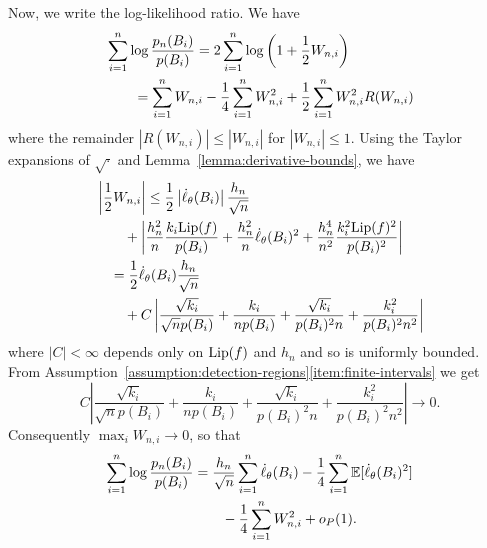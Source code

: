 Now, we write the log-likelihood ratio. We have
\begin{align*}
  & \sum_{i = 1}^n \log \frac{p_n(B_i)}{p(B_i)}
  = 2 \sum_{i = 1}^n \log\left(1 + \frac{1}{2} W_{n,i}\right) \\
  & \qquad  = \sum_{i = 1}^n W_{n,i}
  - \frac{1}{4} \sum_{i = 1}^n W_{n,i}^2
  + \frac{1}{2} \sum_{i = 1}^n W_{n,i}^2 R(W_{n,i})
\end{align*}
where the remainder $|R(W_{n,i})| \le |W_{n,i}|$ for $|W_{n,i}| \le 1$.
Using the Taylor expansions of $\sqrt{\cdot}$ and
Lemma~\ref{lemma:derivative-bounds}, we have
\begin{align}
  &\left| \frac{1}{2} W_{n,i} \right|
   \leq \frac{1}{2} \left| \dot{\ell}_\theta(B_i) \right|
  \frac{h_n}{\sqrt{n}} \nonumber \\
  & \qquad + \left|\frac{h_n^2}{n} \frac{k_i {\rm \textup{Lip}}(f)}{p(B_i)}
  + \frac{h_n^2}{n} \dot{\ell}_\theta(B_i)^2
  + \frac{ h_n^4}{n^2} \frac{k_i^2 {\rm \textup{Lip}}(f)^2}{p(B_i)^2}\right| \nonumber \\
  & \quad = \frac{1}{2} \dot{\ell}_\theta(B_i)
  \frac{h_n}{\sqrt{n}} \nonumber \\
  & \qquad + 
  C \left|\frac{\sqrt{k_i}}{\sqrt{n} p(B_i)}
  + \frac{k_i}{n p(B_i)}
  + \frac{\sqrt{k_i}}{p(B_i)^2 n}
  + \frac{k_i^2}{p(B_i)^2 n^2}
  \right|
  \label{eqn:max-wni-zero}
\end{align}
where $|C| < \infty$ depends only on ${\rm \textup{Lip}}(f)$ and $h_n$ and so is
uniformly bounded. From Assumption~\ref{assumption:detection-regions}\eqref{item:finite-intervals} we get
\[
C \left|\frac{\sqrt{k_i}}{\sqrt{n} p(B_i)}
  + \frac{k_i}{n p(B_i)}
  + \frac{\sqrt{k_i}}{p(B_i)^2 n}
  + \frac{k_i^2}{p(B_i)^2 n^2}
  \right| \to 0. 
\]
Consequently $\max_i W_{n,i} \to 0$, so that
\begin{align}
  \label{eqn:almost-at-the-end}
  \sum_{i = 1}^n \log \frac{p_n(B_i)}{p(B_i)}
  & = \frac{h_n}{\sqrt{n}} \sum_{i = 1}^n \dot{\ell}_\theta(B_i)
  - \frac{1}{4} \sum_{i = 1}^n \mathbb{E}[\dot{\ell}_\theta(B_i)^2] \\
  & \qquad - \frac{1}{4} \sum_{i = 1}^n W_{n,i}^2 + o_P(1). \nonumber
\end{align}

